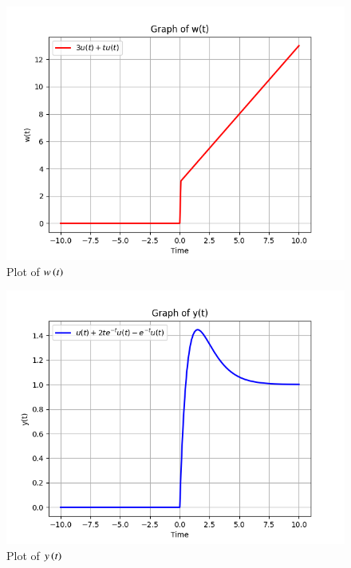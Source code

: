 \documentclass[journal,12pt,twocolumn]{IEEEtran}
\theoremstyle{remark}
\begin{document}
\begin{figure}[H]
    \includegraphics[width=1\columnwidth]{figs/Plot of w(t).png}
    \caption{Plot of $w\left(t\right)$}
    \label{fig:w_t}
\end{figure}

\begin{figure}[H]
    \includegraphics[width=1\columnwidth]{figs/Plot of y(t).png}
    \caption{Plot of $y\left(t\right)$}
    \label{fig:y_t}
\end{figure}
\end{document}
